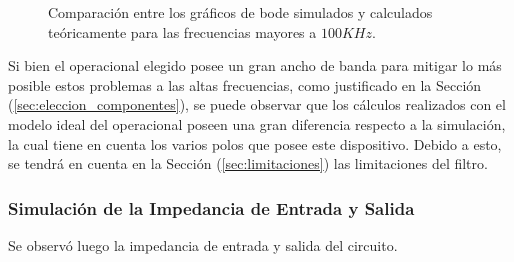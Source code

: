 \begin{figure}[H]
\begin{subfigure}[t]{0.49\textwidth}
	\end{subfigure}
	\label{fig:bode_calc_sim_highf}
	\caption{Comparación entre los gráficos de bode simulados y calculados teóricamente para las frecuencias mayores a $100KHz$.}
\end{figure}

Si bien el operacional elegido posee un gran ancho de banda para mitigar lo más posible estos problemas a las altas frecuencias, como justificado en la Sección (\ref{sec:eleccion_componentes}), se puede observar que los cálculos realizados con el modelo ideal del operacional poseen una gran diferencia respecto a la simulación, la cual tiene en cuenta los varios polos que posee este dispositivo. Debido a esto, se tendrá en cuenta en la Sección (\ref{sec:limitaciones}) las limitaciones del filtro.

\subsubsection{Simulación de la Impedancia de Entrada y Salida}

Se observó luego la impedancia de entrada y salida del circuito.

